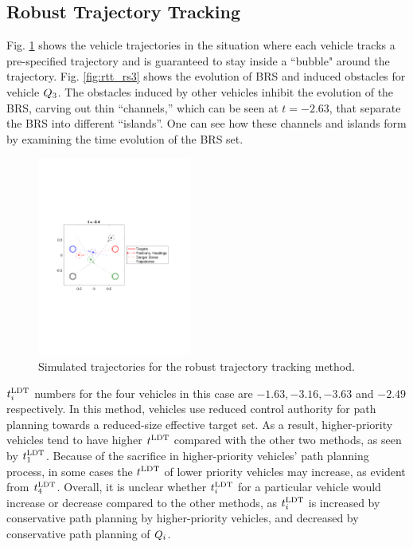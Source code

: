 \subsection{Robust Trajectory Tracking}
Fig. \ref{fig:rtt_traj} shows the vehicle trajectories in the situation where each vehicle tracks a pre-specified trajectory and is guaranteed to stay inside a ``bubble" around the trajectory. Fig. \ref{fig:rtt_rs3} shows the evolution of BRS and induced obstacles for vehicle $Q_3$. The obstacles induced by other vehicles inhibit the evolution of the BRS, carving out thin “channels,” which can be seen at $t = -2.63$, that separate the BRS into different “islands”. One can see how these channels and islands form by examining the time evolution of the BRS set.

\begin{figure}
  \centering
  \includegraphics[width=0.45\textwidth]{"fig/rtt_traj"}
  \caption{Simulated trajectories for the robust trajectory tracking method.}
  \label{fig:rtt_traj}
\end{figure}

$t^\text{LDT}_i$ numbers for the four vehicles in this case are $-1.63, -3.16, -3.63$ and $-2.49$ respectively. In this method, vehicles use reduced control authority for path planning towards a reduced-size effective target set. As a result, higher-priority vehicles tend to have higher $t^\text{LDT}$ compared with the other two methods, as seen by $t^\text{LDT}_1$. Because of the sacrifice in higher-priority vehicles' path planning process, in some cases the $t^\text{LDT}$ of lower priority vehicles may increase, as evident from $t^\text{LDT}_4$. Overall, it is unclear whether $t^\text{LDT}_i$ for a particular vehicle would increase or decrease compared to the other methods, as $t^\text{LDT}_i$ is increased by conservative path planning by higher-priority vehicles, and decreased by conservative path planning of $Q_i$. 


